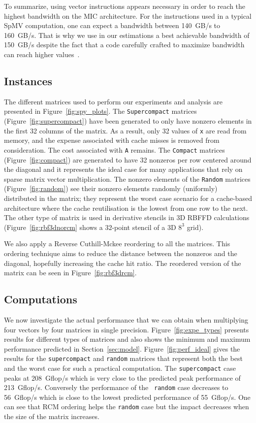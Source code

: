 \documentclass{sig-alternate}
\def\ttt#1{{\tt #1}}
\begin{document}
To summarize, using vector instructions appears necessary in order
to reach the highest bandwidth on the MIC architecture. For the instructions used
in a typical SpMV computation, one can expect a bandwidth between
140~GB/s to 160~GB/s. That is why we use in our estimations a best
achievable bandwidth of 150~GB/s despite the fact that a 
 code carefully crafted to maximize bandwidth can reach higher
values~\cite{Saule13-ARXIV}. 

\subsection{Instances}

The different matrices used to perform our experiments and analysis
are presented in Figure~\ref{fig:spy_plots}. The
\ttt{Supercompact} matrices (Figure~\ref{fig:supercompact}) have been
generated to only have nonzero elements in the first 32 columns of
the matrix. As a result, only 32 values of {\tt x} are read
from memory, and the expense associated with cache misses is removed from consideration. The cost associated with 
{\tt A} remains. The \ttt{Compact} matrices
(Figure~\ref{fig:compact}) are generated to have 32 nonzeros per row
centered around the diagonal and it represents the ideal case for many
applications that rely on sparse matrix vector multiplication. The nonzero
elements of the \ttt{Random}
matrices (Figure~\ref{fig:random}) see their nonzero elements
randomly (uniformly) distributed in the matrix; they represent the
worst case scenario for a cache-based architecture where the cache
reutilisation is the lowest from one row to the next.
The other type of matrix is used in derivative stencils in 3D
RBFFD calculations (Figure~\ref{fig:rbf3dnorcm} shows a $32$-point
stencil of a 3D $8^3$ grid).

We also apply a Reverse Cuthill-Mckee reordering to
all the matrices.  This ordering technique aims to reduce the
distance between the nonzeros and the diagonal, hopefully increasing 
the cache hit ratio.  The reordered version of the matrix can be
seen in Figure~\ref{fig:rbf3drcm}.

\vspace{-0.3em}
\subsection{Computations}

We now investigate the actual performance that we can obtain when
multiplying four vectors by four matrices in single
precision. Figure~\ref{fig:expe_types} presents results for different
types of matrices and also shows the minimum and maximum performance
predicted in Section~\ref{sec:model}. Figure~\ref{fig:perf_ideal}
gives the results for the {\tt supercompact} and {\tt random} matrices
that represent both the best and the worst case for such a practical 
computation. The {\tt supercompact} case peaks at
208~Gflop/s which is very close to the predicted peak
performance of 213~Gflop/s. Conversely the performance of the {\tt
  random} case decreases to 56~Gflop/s which is close to
the lowest predicted performance of 55~Gflop/s. One can see that RCM
ordering helps the {\tt random} case but the impact decreases when the
size of the matrix increases.
\end{document}
